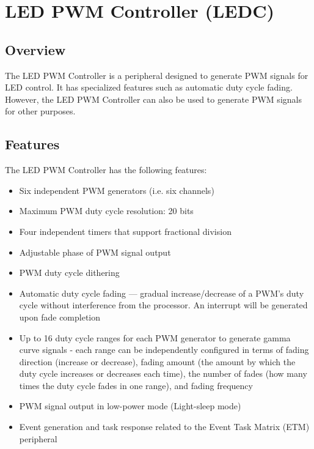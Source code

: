 \documentclass[main\_\_EN.tex]{subfiles}
\begin{document}

\ifglobal
\else
    {\let\clearpage\relax \listoftodos}
    {\let\clearpage\relax \listofdonetodos}
    \tableofcontents
\fi




\hypertarget{ledpwm}{}
\chapter{LED PWM Controller (LEDC)}
\label{mod:ledpwm}


\section{Overview}

The LED PWM Controller is a peripheral designed to generate PWM signals for LED control. It has specialized features such as automatic duty cycle fading. However, the LED PWM Controller can also be used to generate PWM signals for other purposes.

\section{Features}
The LED PWM Controller has the following features:
\begin{itemize}
    \item Six independent PWM generators (i.e. six channels)
    \item Maximum PWM duty cycle resolution: 20 bits
    \item Four independent timers that support fractional division
    \item Adjustable phase of PWM signal output
    \item PWM duty cycle dithering
    \item Automatic duty cycle fading — gradual increase/decrease of a PWM’s duty cycle without interference from the processor. An interrupt will be generated upon fade completion
    \item Up to 16 duty cycle ranges for each PWM generator to generate gamma curve signals - each range can be independently configured in terms of fading direction (increase or decrease), fading amount (the amount by which the duty cycle increases or decreases each time), the number of fades (how many times the duty cycle fades in one range), and fading frequency
    \item PWM signal output in low-power mode (Light-sleep mode)
    \item Event generation and task response related to the Event Task Matrix (ETM) peripheral
\end{itemize}
\end{document}
